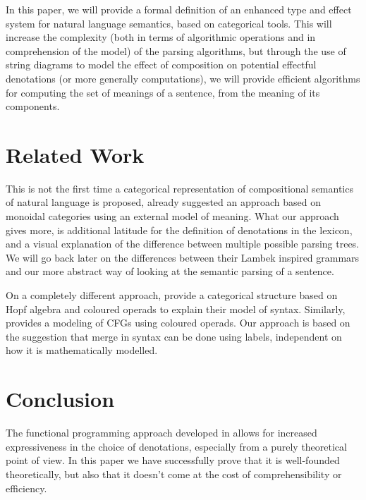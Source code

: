 \documentclass[a4paper,UKenglish,cleveref, autoref, thm-restate]{lipics-v2021}
\begin{document}
\smallskip

In this paper, we will provide a formal definition of an enhanced type and
effect system for natural language semantics, based on categorical tools.
This will increase the complexity (both in terms of algorithmic operations and
in comprehension of the model) of the parsing algorithms, but through the use
of string diagrams to model the effect of composition on potential effectful
denotations (or more generally computations), we will provide efficient
algorithms for computing the set of meanings of a sentence, from the meaning of
its components.

\section{Related Work}
This is not the first time a categorical representation of compositional
semantics of natural language is proposed,
\cite{coeckeMathematicalFoundationsCompositional2010} already suggested an
approach based on monoidal categories using an external model of meaning.
What our approach gives more, is additional latitude for the definition of
denotations in the lexicon, and a visual explanation of the difference between
multiple possible parsing trees.
We will go back later on the differences between their Lambek inspired grammars
and our more abstract way of looking at the semantic parsing of a sentence.

\smallskip

On a completely different approach,
\cite{marcollimatildeetchomskynoametberwickrobertc.MathematicalStructureSyntactic}
provide a categorical structure based on Hopf algebra and coloured operads
to explain their model of syntax.
Similarly, \cite{melliesCategoricalContoursChomskySchutzenberger2025} provides
a modeling of CFGs using coloured operads.
Our approach is based on the suggestion that merge in syntax can be done using
labels, independent on how it is mathematically modelled.







\section{Conclusion}
The functional programming approach developed in
\cite{bumfordEffectdrivenInterpretationFunctors2025} allows for increased
expressiveness in the choice of denotations, especially from a purely
theoretical point of view.
In this paper we have successfully prove that it is well-founded theoretically,
but also that it doesn't come at the cost of comprehensibility or efficiency.
\end{document}
